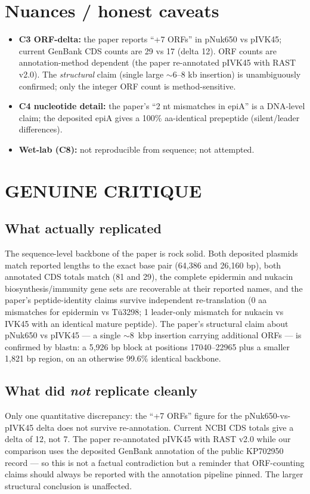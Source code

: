 \documentclass[11pt]{article}
\begin{document}
\section{Nuances / honest caveats}
\begin{itemize}
  \item \textbf{C3 ORF-delta:} the paper reports ``+7 ORFs'' in pNuk650 vs
        pIVK45; current GenBank CDS counts are 29 vs 17 (delta 12). ORF
        counts are annotation-method dependent (the paper re-annotated
        pIVK45 with RAST v2.0). The \emph{structural} claim (single large
        \(\sim\)6--8 kb insertion) is unambiguously confirmed; only the
        integer ORF count is method-sensitive.
  \item \textbf{C4 nucleotide detail:} the paper's ``2 nt mismatches in
        epiA'' is a DNA-level claim; the deposited epiA gives a
        100\% aa-identical prepeptide (silent/leader differences).
  \item \textbf{Wet-lab (C8):} not reproducible from sequence; not attempted.
\end{itemize}

\section{GENUINE CRITIQUE}

\subsection*{What actually replicated}
The sequence-level backbone of the paper is rock solid. Both deposited
plasmids match reported lengths to the exact base pair (64{,}386 and
26{,}160 bp), both annotated CDS totals match (81 and 29), the complete
epidermin and nukacin biosynthesis/immunity gene sets are recoverable at
their reported names, and the paper's peptide-identity claims survive
independent re-translation (0 aa mismatches for epidermin vs T\"u3298; 1
leader-only mismatch for nukacin vs IVK45 with an identical mature
peptide). The paper's structural claim about pNuk650 vs pIVK45 --- a
single \(\sim\)8~kbp insertion carrying additional ORFs --- is confirmed by
blastn: a 5{,}926 bp block at positions 17040--22965 plus a smaller 1{,}821
bp region, on an otherwise 99.6\% identical backbone.

\subsection*{What did \emph{not} replicate cleanly}
Only one quantitative discrepancy: the ``+7 ORFs'' figure for the
pNuk650-vs-pIVK45 delta does not survive re-annotation. Current NCBI
CDS totals give a delta of 12, not 7. The paper re-annotated pIVK45 with
RAST v2.0 while our comparison uses the deposited GenBank annotation of the
public KP702950 record --- so this is not a factual contradiction but a
reminder that ORF-counting claims should always be reported with the
annotation pipeline pinned. The larger structural conclusion is unaffected.
\end{document}
